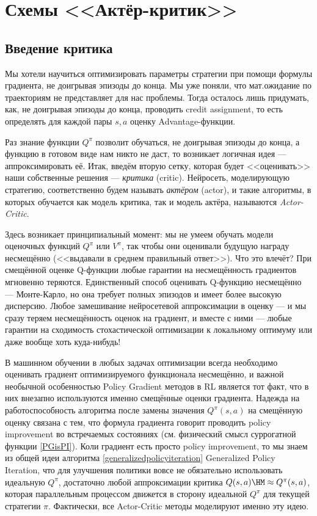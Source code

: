 \section{Схемы <<Актёр-критик>>}\label{ActorCriticSection}

\subsection{Введение критика}

Мы хотели научиться оптимизировать параметры стратегии при помощи формулы градиента, не доигрывая эпизоды до конца. Мы уже поняли, что мат.ожидание по траекториям не представляет для нас проблемы. Тогда осталось лишь придумать, как, не доигрывая эпизоды до конца, проводить credit assignment, то есть определять для каждой пары $s, a$ оценку Advantage-функции.

Раз знание функции $Q^\pi$ позволит обучаться, не доигрывая эпизоды до конца, а функцию в готовом виде нам никто не даст, то возникает логичная идея --- аппроксимировать её. Итак, введём вторую сетку, которая будет <<оценивать>> наши собственные решения --- \emph{критика} (critic). Нейросеть, моделирующую стратегию, соответственно будем называть \emph{актёром} (actor), и такие алгоритмы, в которых обучается как модель критика, так и модель актёра, называются \emph{Actor-Critic}.

Здесь возникает принципиальный момент: мы не умеем обучать модели оценочных функций $Q^\pi$ или $V^\pi$, так чтобы они оценивали будущую награду несмещённо (<<выдавали в среднем правильный ответ>>). Что это влечёт? При смещённой оценке Q-функции любые гарантии на несмещённость градиентов мгновенно теряются. Единственный способ оценивать Q-функцию несмещённо --- Монте-Карло, но она требует полных эпизодов и имеет более высокую дисперсию. Любое замешивание нейросетевой аппроксимации в оценку --- и мы сразу теряем несмещённость оценок на градиент, и вместе с ними --- любые гарантии на сходимость стохастической оптимизации к локальному оптимуму или даже вообще хоть куда-нибудь!

В машинном обучении в любых задачах оптимизации всегда необходимо оценивать градиент оптимизируемого функционала несмещённо, и важной необычной особенностью Policy Gradient методов в RL является тот факт, что в них внезапно используются именно смещённые оценки градиента. Надежда на работоспособность алгоритма после замены значения $Q^\pi(s, a)$ на смещённую оценку связана с тем, что формула градиента говорит проводить policy improvement во встречаемых состояниях (см. физический смысл суррогатной функции \eqref{PGisPI}). Коли градиент есть просто policy improvement, то мы знаем из общей идеи алгоритма \ref{generalizedpolicyiteration} Generalized Policy Iteration, что для улучшения политики вовсе не обязательно использовать идеальную $Q^\pi$, достаточно любой аппроксимации критика $Q(s, a) \HM \approx Q^\pi(s, a)$, которая параллельным процессом движется в сторону идеальной $Q^\pi$ для текущей стратегии $\pi$. Фактически, все Actor-Critic методы моделируют именно эту идею.

